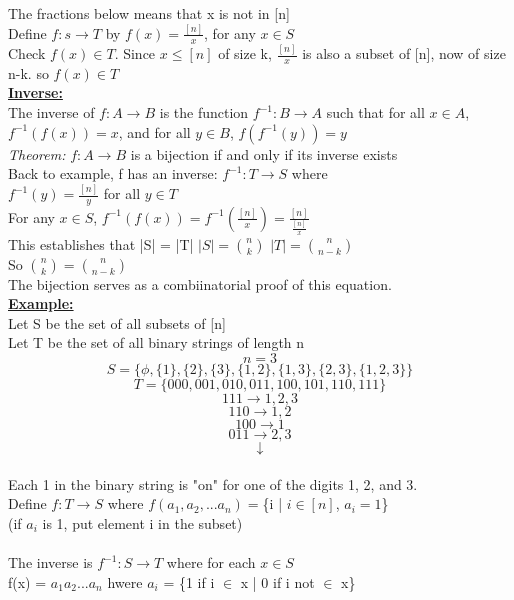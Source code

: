 \documentclass[12pt]{article}
\newcommand{\myt}[1]{\textbf{\underline{#1}}}
\begin{document}
	The fractions below means that x is not in [n]\\
	
	Define $f: s \rightarrow T$ by $f(x) = \frac{[n]}{x}$, for any $x \in S$\\
	Check $f(x) \in T$. Since $x \leq [n]$ of size k, $\frac{[n]}{x}$ is also a subset of [n], now of size n-k. so $f(x) \in T$\\
	
	\myt{Inverse:}\\
	The inverse of $f: A \rightarrow B$ is the function $f^{-1}: B \rightarrow A$ such that for all $x \in A$, $f^{-1}(f(x)) = x$, and for all $y \in B$, $f(f^{-1}(y)) = y$\\
	
	\emph{Theorem: } $f: A \rightarrow B$ is a bijection if and only if its inverse exists\\
	
	Back to example, f has an inverse: $f^{-1}: T \rightarrow S$ where\\
	$f^{-1}(y) = \frac{[n]}{y}$ for all $y \in T$\\
	For any $x \in S$, $f^{-1}(f(x)) = f^{-1}(\frac{[n]}{x}) = \frac{[n]}{\frac{[n]}{x}}$\\
	
	This establishes that |S| = |T| $|S| = {n \choose k}$ $|T| = {n \choose n - k}$\\
	So ${n \choose k} = {n \choose n-k}$\\
	The bijection serves as a combiinatorial proof of this equation.\\
	
	\myt{Example:}\\
	Let S be the set of all subsets of [n]\\
	Let T be the set of all binary strings of length n\\
	$$n = 3$$
	$$S = \{\phi, \{1\}, \{2\}, \{3\}, \{1, 2\}, \{1,3\}, \{2,3\}, \{1,2,3\}\}$$
	$$T = \{000, 001, 010, 011, 100, 101, 110, 111\}$$
	$$111 \rightarrow 1,2,3$$
	$$110 \rightarrow 1,2$$
	$$100 \rightarrow 1$$
	$$011 \rightarrow 2,3$$
	$$\downarrow$$\\
	Each 1 in the binary string is "on" for one of the digits 1, 2, and 3.\\
	
	Define $f: T \rightarrow S$ where $f(a_1, a_2, ...a_n) = $\{i | $i \in [n]$, $a_i = 1$\}\\
	(if $a_i$ is 1, put element i in the subset)\\\\
	
	The inverse is $f^{-1}: S \rightarrow T$ where for each $x \in S$\\
	f(x) = $a_1a_2...a_n$ hwere $a_i$ = \{1 if i $\in$ x | 0 if i not $\in$ x\}\\
	
	
	
	
	
	
	
	
\end{document}
